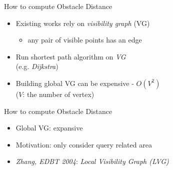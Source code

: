 \begin{frame}{How to compute Obstacle Distance}
\begin{minipage}{.4\textwidth}
\begin{itemize}
\item \small Existing works rely on \textit{visibility graph} (VG)
    \begin{itemize}
        \item \small any pair of visible points has an edge
    \end{itemize}
\item \small Run shortest path algorithm on \textit{VG}\\
    \tiny{(e.g. \textit{Dijkstra})}
\item \small {Building global VG can be expensive - $O(V^2)$\\
            \tiny{($V$: the number of vertex})}
\end{itemize}
\end{minipage}%
\begin{minipage}{.6\textwidth}
\begin{adjustbox}{max totalsize={.9\textwidth}{.9\textheight}, right}
\end{adjustbox}
\end{minipage}
\end{frame}

\begin{frame}{How to compute Obstacle Distance}
\begin{minipage}{.4\textwidth}
\begin{itemize}
\item \small Global VG: expansive
\item \small Motivation: only consider query related area
\item \small {\textit{Zhang, EDBT 2004}: \textit{Local Visibility Graph (LVG)}}
\end{itemize}
\end{minipage}%
\begin{minipage}{.6\textwidth}
\begin{adjustbox}{max totalsize={.9\textwidth}{.9\textheight}, right}
\end{adjustbox}
\end{minipage}
\end{frame}

